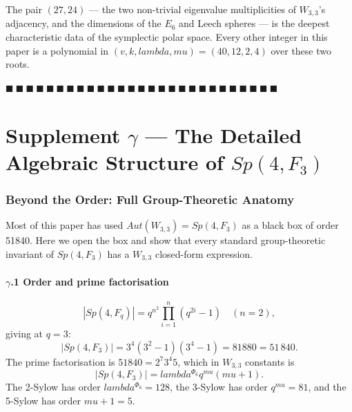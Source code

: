 \documentclass[12pt,a4paper]{article}
\def\mathbb#1{#1}%
\def\mathrm#1{#1}%
\def\lambda{lambda}%
\def\mu{mu}%
\def\Phi#1{Phi#1}%
\def\cdot{ }%
\theoremstyle{definition}
\newcommand{\Sp}{\mathrm{Sp}}
\newcommand{\Aut}{\mathrm{Aut}}
\newcommand{\FF}{\mathbb{F}}
\begin{document}
The pair $(27, 24)$ — the two non-trivial eigenvalue multiplicities
of $W_{3,3}$'s adjacency, and the dimensions of the $E_6$ and Leech
spheres — is the deepest characteristic data of the symplectic polar
space. Every other integer in this paper is a polynomial in
$(v, k, \lambda, \mu) = (40, 12, 2, 4)$ over these two roots.

\hfill $\blacksquare\ \blacksquare\ \blacksquare\ \blacksquare\ \blacksquare\ \blacksquare\ \blacksquare\ \blacksquare\ \blacksquare\ \blacksquare\ \blacksquare\ \blacksquare\ \blacksquare\ \blacksquare\ \blacksquare\ \blacksquare\ \blacksquare\ \blacksquare\ \blacksquare\ \blacksquare\ \blacksquare\ \blacksquare\ \blacksquare\ \blacksquare\ \blacksquare\ \blacksquare\ \blacksquare$

\clearpage
\part*{\texorpdfstring{Supplement $\gamma$ --- The Detailed Algebraic Structure of $\Sp(4,\FF_3)$}{Supplement gamma --- The Detailed Algebraic Structure of Sp(4,F3)}}

\section*{Beyond the Order: Full Group-Theoretic Anatomy}

Most of this paper has used $\Aut(W_{3,3}) = \Sp(4,\FF_3)$ as a black
box of order 51840. Here we open the box and show that every standard
group-theoretic invariant of $\Sp(4,\FF_3)$ has a $W_{3,3}$ closed-form
expression.

\subsection*{$\gamma$.1 \quad Order and prime factorisation}
\[
|\Sp(4,\FF_q)| = q^{n^2} \prod_{i=1}^n(q^{2i}-1) \quad (n=2),
\]
giving at $q=3$:
\[
|\Sp(4,\FF_3)| = 3^4(3^2-1)(3^4-1) = 81\cdot 8\cdot 80 = 51\,840.
\]
The prime factorisation is $51840 = 2^7\cdot 3^4\cdot 5$, which in
$W_{3,3}$ constants is
\[
\boxed{\;|\Sp(4,\FF_3)| = \lambda^{\Phi_6}\cdot q^{\mu}\cdot(\mu+1).\;}
\]
The 2-Sylow has order $\lambda^{\Phi_6}=128$, the 3-Sylow has order
$q^{\mu}=81$, and the 5-Sylow has order $\mu+1=5$.
\end{document}
